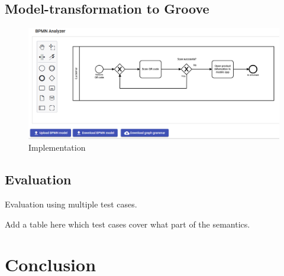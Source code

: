 \documentclass[adraft, copyright, creativecommons]{eptcs} %
\begin{document}
\subsection{Model-transformation to Groove}

\begin{figure}[h]
    \centering
    \includegraphics[width=1\textwidth]{images/impl.png}
    \caption{Implementation}
    \label{fig:impl}
\end{figure}

\subsection{Evaluation}
Evaluation using multiple test cases.

Add a table here which test cases cover what part of the semantics.
\section{Conclusion}


\end{document}
